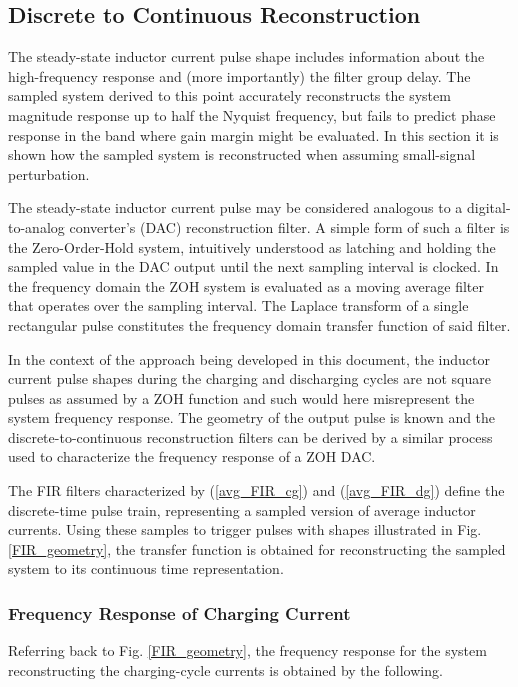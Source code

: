 \documentclass[conference]{IEEEtran}
\begin{document}
\subsection{Discrete to Continuous Reconstruction}
The steady-state inductor current pulse shape includes information about the high-frequency response and (more importantly) the filter group delay. The sampled system derived to this point accurately reconstructs the system magnitude response up to half the Nyquist frequency, but fails to predict phase response in the band where gain margin might be evaluated.  In this section it is shown how the sampled system is reconstructed when assuming small-signal perturbation.

The steady-state inductor current pulse may be considered analogous to a digital-to-analog converter's (DAC) reconstruction filter. A simple form of such a filter is the Zero-Order-Hold system, intuitively understood as latching and holding the sampled value in the DAC output until the next sampling interval is clocked.  In the frequency domain the ZOH system is evaluated as a moving average filter that operates over the sampling interval.  The Laplace transform of a single rectangular pulse constitutes the frequency domain transfer function of said filter.  

In the context of the approach being developed in this document, the inductor current pulse shapes during the charging and discharging cycles are not square pulses as assumed by a ZOH function and such would here misrepresent the system frequency response.  The geometry of the output pulse is known and the discrete-to-continuous reconstruction filters can be derived by a similar process used to characterize the frequency response of a ZOH DAC. 

The FIR filters characterized by (\ref{avg_FIR_cg}) and (\ref{avg_FIR_dg}) define the discrete-time pulse train, representing a sampled version of average inductor currents.  Using these samples to trigger pulses with shapes illustrated in Fig. \ref{FIR_geometry}, the transfer function is obtained for reconstructing the sampled system to its continuous time representation. 

\subsubsection{Frequency Response of Charging Current}
Referring back to Fig. \ref{FIR_geometry}, the frequency response for the system reconstructing the charging-cycle currents is obtained by the following.
\end{document}
